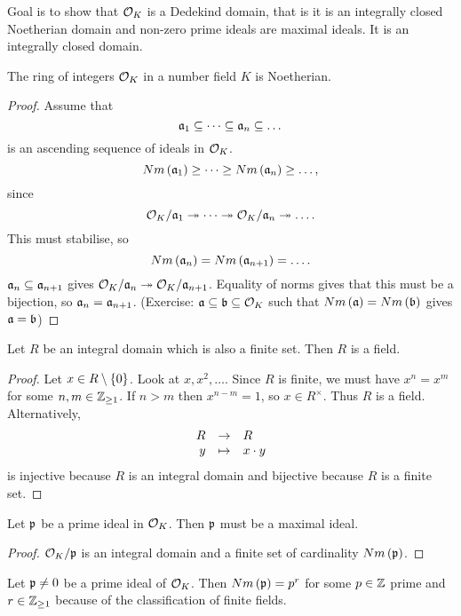 Goal is to show that $ \OO_K $ is a Dedekind domain, that is it is an integrally closed Noetherian domain and non-zero prime ideals are maximal ideals. It is an integrally closed domain.

\begin{proposition}
The ring of integers $ \OO_K $ in a number field $ K $ is Noetherian.
\end{proposition}

\begin{proof}
Assume that
$$ \aa_1 \subseteq \dots \subseteq \aa_n \subseteq \dots $$
is an ascending sequence of ideals in $ \OO_K $.
$$ Nm\rb{\aa_1} \ge \dots \ge Nm\rb{\aa_n} \ge \dots, $$
since
$$ \OO_K / \aa_1 \twoheadrightarrow \dots \twoheadrightarrow \OO_K / \aa_n \twoheadrightarrow \dots. $$
This must stabilise, so
$$ Nm\rb{\aa_n} = Nm\rb{\aa_{n + 1}} = \dots. $$
$ \aa_n \subseteq \aa_{n + 1} $ gives $ \OO_K / \aa_n \twoheadrightarrow \OO_K / \aa_{n + 1} $. Equality of norms gives that this must be a bijection, so $ \aa_n = \aa_{n + 1} $. (Exercise: $ \aa \subseteq \bb \subseteq \OO_K $ such that $ Nm\rb{\aa} = Nm\rb{\bb} $ gives $ \aa = \bb $)
\end{proof}

\pagebreak

\begin{lemma}
Let $ R $ be an integral domain which is also a finite set. Then $ R $ is a field.
\end{lemma}

\begin{proof}
Let $ x \in R \setminus \cb{0} $. Look at $ x, x^2, \dots $. Since $ R $ is finite, we must have $ x^n = x^m $ for some $ n, m \in \Z_{\ge 1} $. If $ n > m $ then $ x^{n - m} = 1 $, so $ x \in R^\times $. Thus $ R $ is a field. Alternatively,
$$ \function{R}{R}{y}{x \cdot y} $$
is injective because $ R $ is an integral domain and bijective because $ R $ is a finite set.
\end{proof}

\begin{lemma}
Let $ \pp $ be a prime ideal in $ \OO_K $. Then $ \pp $ must be a maximal ideal.
\end{lemma}

\begin{proof}
$ \OO_K / \pp $ is an integral domain and a finite set of cardinality $ Nm\rb{\pp} $.
\end{proof}

\begin{remark*}
Let $ \pp \ne 0 $ be a prime ideal of $ \OO_K $. Then $ Nm\rb{\pp} = p^r $ for some $ p \in \Z $ prime and $ r \in \Z_{\ge 1} $ because of the classification of finite fields.
\end{remark*}

